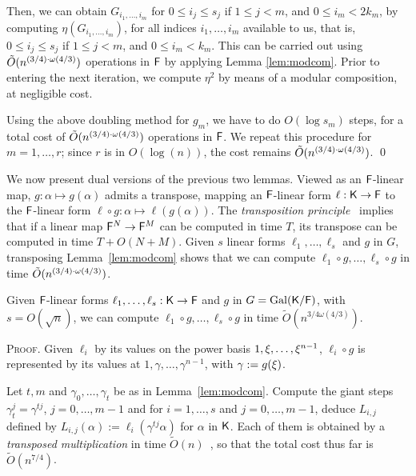  Then, we can obtain $G_{i_1,\dots,i_m}$ for $0 \leq i_j \leq s_j$ if $1
 \leq j < m$, and $0 \leq i_m < 2k_m$, by computing
 $\eta(G_{i_1,\dots,i_m})$, for all indices $i_1,\dots,i_m$ available
 to us, that is, $0 \leq i_j \leq s_j$ if $1 \leq j < m$, and $0 \leq
 i_m < k_m$. This can be carried out using $\tilde{O}(n^{(3/4)\cdot \omega(4/3)})$ operations
 in ${\mathsf{F}}$ by applying Lemma \ref{lem:modcom}. Prior to entering the
 next iteration, we compute $\eta^2$ by means of a modular
 composition, at negligible cost. 

 Using the above doubling method for $g_m$, we have to do $O(\log
 s_m)$ steps, for a total cost of $\tilde{O}(n^{(3/4)\cdot \omega(4/3)})$ operations in ${\mathsf{F}}$.  We
 repeat this procedure for $m=1,\dots,r$; since $r$ is in $O(\log(n))$,
 the cost remains $\tilde{O}(n^{(3/4)\cdot \omega(4/3)})$.
\qed

We now present dual versions of the previous two lemmas. Viewed as an
${\mathsf{F}}$-linear map, $g:\alpha \mapsto g(\alpha)$ admits a
transpose, mapping an ${\mathsf{F}}$-linear form $\ell:{\mathsf{K}}\to{\mathsf{F}}$ to the
${\mathsf{F}}$-linear form $\ell \circ g: \alpha \mapsto \ell(g(\alpha))$.  The
{\em transposition principle}~\cite{KaKiBs88,CaKaYa89} implies that if
a linear map ${\mathsf{F}}^N \to {\mathsf{F}}^M$ can be computed in time $T$, its
transpose can be computed in time $T+O(N+M)$. Given $s$
linear forms $\ell_1,\dots,\ell_s$ and $g$ in $G$, transposing
Lemma~\ref{lem:modcom} shows that we can compute $\ell_1 \circ
g,\dots,\ell_s \circ g$ in time $\tilde{O}(n^{(3/4)\cdot \omega(4/3)})$.

\begin{lemma}
  \label{lem:modcomT}
  Given ${\mathsf{F}}$-linear forms $\ell_1,\dots,\ell_s:{\mathsf{K}}\to {\mathsf{F}}$ and $g$ in $G =
  \mathrm{Gal}({\mathsf{K}}/{\mathsf{F}})$, with $s = O(\sqrt{n})$, we can compute
  $\ell_1\circ g,\dots,\ell_s \circ g$ in time $\tilde
  O(n^{{3}/{4}\omega({4}/{3})})$.
\end{lemma}
\noindent\textsc{Proof.}
  Given $\ell_i$ by its values on the power basis $1,\xi,\dots,\xi^{n-1}$, $\ell_i \circ g$ is represented by its values at
  $1,\gamma,\dots,\gamma^{n-1}$, with $\gamma := g(\xi)$. 

  Let $t,m$ and $\gamma_0,\dots,\gamma_t$ be as in
  Lemma~\ref{lem:modcom}. Compute the giant steps
  $\gamma_t^j = \gamma^{tj}$, $j=0,\dots,m-1$ and for $i=1,\dots,s$
  and $j=0,\dots,m-1$, deduce $L_{i,j}$ defined by
  $L_{i,j}(\alpha) := \ell_i(\gamma^{tj}\alpha)$ for $\alpha$ in
  ${\mathsf{K}}$. Each of them is obtained by a {\em transposed
    multiplication} in time $\tilde{O}(n)$~\cite[\S4.1]{Shoup},
  so that the total cost thus far is $\tilde{O}(n^{7/4})$.

